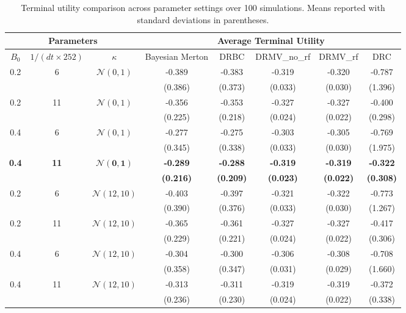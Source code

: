\documentclass[11pt]{article}
\theoremstyle{definition}
\begin{document}
\begin{table}[htbp]
\label{utility_highdim}
\centering
\small
\renewcommand{\arraystretch}{1.25}
\begin{tabular}{cccccccc}
\toprule
\multicolumn{3}{c}{Parameters} & \multicolumn{5}{c}{Average Terminal Utility} \\
\midrule
$B_0$ & $1/(dt\times252)$ & $\kappa$ & Bayesian Merton & DRBC & DRMV\_no\_rf & DRMV\_rf & DRC \\
\midrule

0.2 & 6  & $\mathcal{N}(0,1)$ 
& -0.389 & -0.383 & -0.319 & -0.320 & -0.787 \\
&     &        
& (0.386) & (0.373) & (0.033) & (0.030) & (1.396) \\

0.2 & 11 & $\mathcal{N}(0,1)$ 
& -0.356 & -0.353 & -0.327 & -0.327 & -0.400 \\
&     &        
& (0.225) & (0.218) & (0.024) & (0.022) & (0.298) \\

0.4 & 6  & $\mathcal{N}(0,1)$ 
& -0.277 & -0.275 & -0.303 & -0.305 & -0.769 \\
&     &        
& (0.345) & (0.338) & (0.033) & (0.030) & (1.975) \\

\textbf{0.4} & \textbf{11} & $\bm{\mathcal{N}(0,1)}$
& \textbf{-0.289} & \textbf{-0.288} & \textbf{-0.319} & \textbf{-0.319} & \textbf{-0.322} \\
&     &        
& \textbf{(0.216)} & \textbf{(0.209)} & \textbf{(0.023)} & \textbf{(0.022)} & \textbf{(0.308)} \\

0.2 & 6  & $\mathcal{N}(12,10)$ 
& -0.403 & -0.397 & -0.321 & -0.322 & -0.773 \\
&     &        
& (0.390) & (0.376) & (0.033) & (0.030) & (1.267) \\

0.2 & 11 & $\mathcal{N}(12,10)$ 
& -0.365 & -0.361 & -0.327 & -0.327 & -0.417 \\
&     &        
& (0.229) & (0.221) & (0.024) & (0.022) & (0.306) \\

0.4 & 6  & $\mathcal{N}(12,10)$ 
& -0.304 & -0.300 & -0.306 & -0.308 & -0.708 \\
&     &        
& (0.358) & (0.347) & (0.031) & (0.029) & (1.660) \\

0.4 & 11 & $\mathcal{N}(12,10)$ 
& -0.313 & -0.311 & -0.319 & -0.319 & -0.372 \\
&     &        
& (0.236) & (0.230) & (0.024) & (0.022) & (0.338) \\

\bottomrule
\end{tabular}
\caption{Terminal utility comparison across parameter settings over 100 simulations. Means reported with standard deviations in parentheses.}
\end{table}
\end{document}
